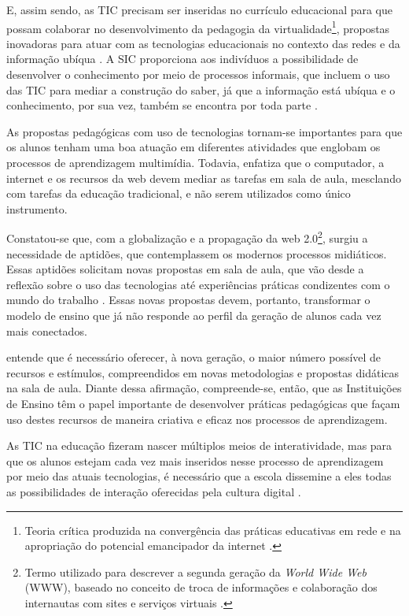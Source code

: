 \documentclass[portuguese]{textolivre}
\begin{document}
E, assim sendo, as TIC precisam ser inseridas no currículo educacional
para que possam colaborar no desenvolvimento da pedagogia da
virtualidade\footnote{Teoria crítica produzida na convergência das
  práticas educativas em rede e na apropriação do potencial emancipador
  da internet \cite{gomez2015}.}, propostas inovadoras para atuar com
as tecnologias educacionais no contexto das redes e da informação ubíqua
\cite{gomez2015, rojo2016}. A SIC proporciona aos indivíduos a
possibilidade de desenvolver o conhecimento por meio de processos
informais, que incluem o uso das TIC para mediar a construção do saber,
já que a informação está ubíqua e o conhecimento, por sua vez, também se
encontra por toda parte \cite{pozo2004}.

As propostas pedagógicas com uso de tecnologias tornam-se importantes
para que os alunos tenham uma boa atuação em diferentes atividades que
englobam os processos de aprendizagem multimídia. Todavia, \textcite{gomez2015}
enfatiza que o computador, a internet e os recursos da web devem mediar
as tarefas em sala de aula, mesclando com tarefas da educação
tradicional, e não serem utilizados como único instrumento.

Constatou-se que, com a globalização e a propagação da web
2.0\footnote{Termo utilizado para descrever a segunda geração da
  \emph{World Wide Web} (WWW), baseado no conceito de troca de
  informações e colaboração dos internautas com sites e serviços
  virtuais \cite{lambert2010}.}, surgiu a necessidade de aptidões, que
contemplassem os modernos processos midiáticos. Essas aptidões solicitam
novas propostas em sala de aula, que vão desde a reflexão sobre o uso
das tecnologias até experiências práticas condizentes com o mundo do
trabalho \cite{cherubin2012}. Essas novas propostas devem, portanto,
transformar o modelo de ensino que já não responde ao perfil da geração
de alunos cada vez mais conectados.

\textcite{rojo2016} entende que é necessário oferecer, à nova geração, o maior
número possível de recursos e estímulos, compreendidos em novas
metodologias e propostas didáticas na sala de aula. Diante dessa
afirmação, compreende-se, então, que as Instituições de Ensino têm o
papel importante de desenvolver práticas pedagógicas que façam uso
destes recursos de maneira criativa e eficaz nos processos de
aprendizagem.

As TIC na educação fizeram nascer múltiplos meios de interatividade, mas
para que os alunos estejam cada vez mais inseridos nesse processo de
aprendizagem por meio das atuais tecnologias, é necessário que a escola
dissemine a eles todas as possibilidades de interação oferecidas pela
cultura digital \cite{lisboa2010}.
\end{document}

